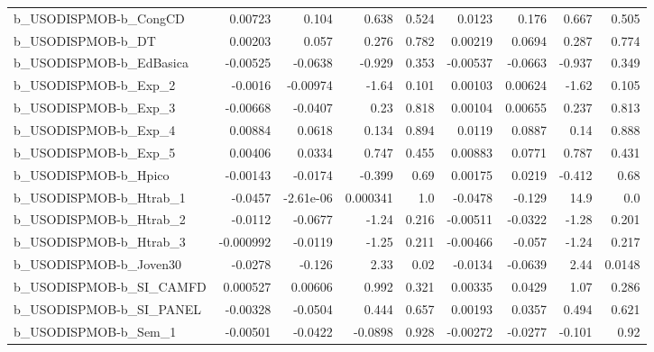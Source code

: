 \begin{tabular}{lrrrrrrrr}
b\_USODISPMOB-b\_CongCD      &     0.00723 &        0.104 &     0.638 &    0.524 &     0.0123 &       0.176 &        0.667 &         0.505 \\
b\_USODISPMOB-b\_DT          &     0.00203 &        0.057 &     0.276 &    0.782 &    0.00219 &      0.0694 &        0.287 &         0.774 \\
b\_USODISPMOB-b\_EdBasica    &    -0.00525 &      -0.0638 &    -0.929 &    0.353 &   -0.00537 &     -0.0663 &       -0.937 &         0.349 \\
b\_USODISPMOB-b\_Exp\_2       &     -0.0016 &     -0.00974 &     -1.64 &    0.101 &    0.00103 &     0.00624 &        -1.62 &         0.105 \\
b\_USODISPMOB-b\_Exp\_3       &    -0.00668 &      -0.0407 &      0.23 &    0.818 &    0.00104 &     0.00655 &        0.237 &         0.813 \\
b\_USODISPMOB-b\_Exp\_4       &     0.00884 &       0.0618 &     0.134 &    0.894 &     0.0119 &      0.0887 &         0.14 &         0.888 \\
b\_USODISPMOB-b\_Exp\_5       &     0.00406 &       0.0334 &     0.747 &    0.455 &    0.00883 &      0.0771 &        0.787 &         0.431 \\
b\_USODISPMOB-b\_Hpico       &    -0.00143 &      -0.0174 &    -0.399 &     0.69 &    0.00175 &      0.0219 &       -0.412 &          0.68 \\
b\_USODISPMOB-b\_Htrab\_1     &     -0.0457 &    -2.61e-06 &  0.000341 &      1.0 &    -0.0478 &      -0.129 &         14.9 &           0.0 \\
b\_USODISPMOB-b\_Htrab\_2     &     -0.0112 &      -0.0677 &     -1.24 &    0.216 &   -0.00511 &     -0.0322 &        -1.28 &         0.201 \\
b\_USODISPMOB-b\_Htrab\_3     &   -0.000992 &      -0.0119 &     -1.25 &    0.211 &   -0.00466 &      -0.057 &        -1.24 &         0.217 \\
b\_USODISPMOB-b\_Joven30     &     -0.0278 &       -0.126 &      2.33 &     0.02 &    -0.0134 &     -0.0639 &         2.44 &        0.0148 \\
b\_USODISPMOB-b\_SI\_CAMFD    &    0.000527 &      0.00606 &     0.992 &    0.321 &    0.00335 &      0.0429 &         1.07 &         0.286 \\
b\_USODISPMOB-b\_SI\_PANEL    &    -0.00328 &      -0.0504 &     0.444 &    0.657 &    0.00193 &      0.0357 &        0.494 &         0.621 \\
b\_USODISPMOB-b\_Sem\_1       &    -0.00501 &      -0.0422 &   -0.0898 &    0.928 &   -0.00272 &     -0.0277 &       -0.101 &          0.92 \\

\end{tabular}
